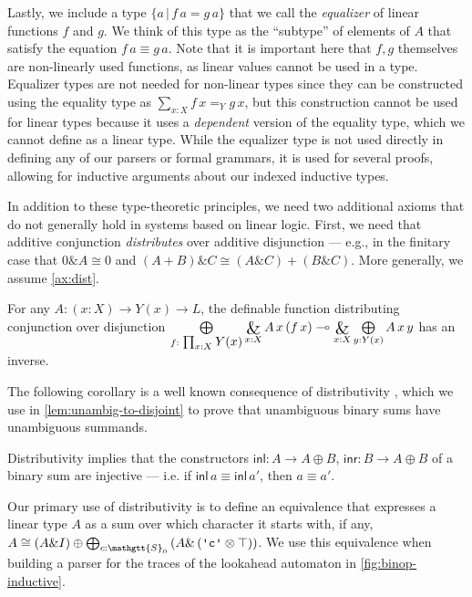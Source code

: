 \documentclass[acmsmall,nonacm]{acmart}
\renewcommand{\Sigma}{\mathgtt{S}}
\newcommand{\inl}{\mathsf{inl}}
\newcommand{\inr}{\mathsf{inr}}
\newcommand{\lto}{\multimap}
\DeclareMathOperator*{\bigwith}{\scalerel*{\&}{\bigoplus}}
\newcommand{\literal}[1]{\texttt{\textquotesingle#1\textquotesingle}}
\newcommand{\letin}[3]{\mathsf{let}\, #1 = #2 \, \mathsf{in}\, #3}
\newcommand{\lamblto}[2]{\lambda^{{\lto}} #1.\, #2}
\newcommand{\withlamb}[2]{{\lambda}^{{\&}} #1.\, #2}
\newcommand{\applto}[2]{#1 \, #2}
\newcommand{\PiTy}[3]{\textstyle\prod_{#1 : #2} #3}
\newcommand{\LinPiTyLimit}[3]{\bigwith\limits_{#1 : #2} #3}
\newcommand{\LinSigTy}[3]{\textstyle\bigoplus_{#1 : #2} #3}
\newcommand{\LinSigTyLimit}[3]{\bigoplus\limits_{#1 : #2} #3}
\newcommand{\equalizer}[3]{\{#1\,|\,\applto {#2}{#1} = \applto{#3}{#1} \}}
\begin{document}
Lastly, we include a type $\equalizer {a}{f}{g}$ that we call the
\emph{equalizer} of linear functions $f$ and $g$. We think of this
type as the ``subtype'' of elements of $A$ that satisfy the equation
$f\,a\equiv g\,a$. Note that it is important here that $f, g$
themselves are non-linearly used functions, as linear values cannot be
used in a type.  Equalizer types are not needed for non-linear types
since they can be constructed using the equality type as $\sum_{x:X}
f\,x=_Y g\,x$, but this construction cannot be used for linear types
because it uses a \emph{dependent} version of the equality type, which
we cannot define as a linear type. While the equalizer type is not
used directly in defining any of our parsers or formal grammars, it is
used for several proofs, allowing for inductive arguments about our
indexed inductive types.

In addition to these type-theoretic principles, we need two additional
axioms that do not generally hold in systems based on linear
logic. First, we need that additive conjunction \emph{distributes}
over additive disjunction --- e.g., in the finitary case that $0 \& A
\cong 0$ and $(A + B) \& C \cong (A \& C) + (B \& C)$. More generally, we assume
\cref{ax:dist}.

\begin{axiom}[Distributivity]
\label{ax:dist}
For any $A : (x : X) \to Y(x) \to L$, the definable function distributing
conjunction over disjunction
\(\LinSigTyLimit{f}{\PiTy{x}{X}{Y(x)}}{\LinPiTyLimit{x}{X}{A\,x\,(f\,x)}} \lto
\LinPiTyLimit{x}{X}{\LinSigTyLimit{y}{Y(x)}{A\,x\,y}}
\)
has an inverse.
\end{axiom}

The following corollary is a well known consequence of distributivity \cite{Cockett_1993}, which we use in \cref{lem:unambig-to-disjoint} to prove that unambiguous binary sums have unambiguous summands.
\begin{corollary}
  \label{cor:binary-mono}
  Distributivity implies that the constructors $\inl : A \to A \oplus B$,
  $\inr : B \to A \oplus B$ of a binary sum are injective --- i.e. if
  $\inl\,a \equiv \inl\,a'$, then $a \equiv a'$.
\end{corollary}

Our primary use of distributivity is to define an equivalence that
expresses a linear type $A$ as a sum over which character it starts with, if any,
\(
A \cong \left(A \& I \right) \oplus \LinSigTy{c}{\Sigma_0}{\left( A \& \left( \literal{c} \otimes \top \right) \right)}
\). We use this equivalence when building a parser for the traces of the lookahead
automaton in \cref{fig:binop-inductive}.
\end{document}
